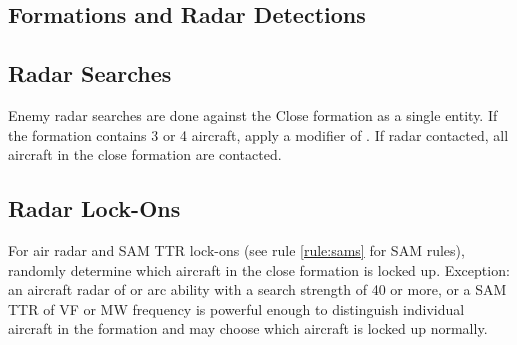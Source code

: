 \begin{advancedrules}

    \section{Formations and Radar Detections}

    \subsection{Radar Searches} Enemy radar searches are done against the Close formation as a single entity. If the formation contains 3 or 4 aircraft, apply a modifier of . If radar contacted, all aircraft in the close formation are contacted.

    \subsection{Radar Lock-Ons} For air radar and SAM TTR lock-ons (see rule \ref{rule:sams} for SAM rules), randomly determine which aircraft in the close formation is locked up. Exception: an aircraft radar of  or  arc ability with a search strength of 40 or more, or a SAM TTR of VF or MW frequency is powerful enough to distinguish individual aircraft in the formation and may choose which aircraft is locked up normally.

\end{advancedrules}

